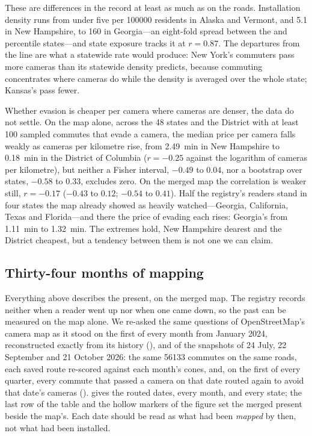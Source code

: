 \documentclass[11pt,twoside]{article}
\begin{document}
These are differences in the record at least as much as on the roads. Installation density
runs from under five per \num{100000} residents in Alaska and Vermont, and \num{5.1} in New
Hampshire, to \num{160} in Georgia---an eight-fold spread between the  and 
percentile states---and state exposure tracks it at $r=0.87$. The departures from the line are
what a statewide rate would produce: New York's commuters pass more cameras than its
statewide density predicts, because commuting concentrates where cameras do while the density
is averaged over the whole state; Kansas's pass fewer.

Whether evasion is cheaper per camera where cameras are denser, the data do not settle. On
the map alone, across the 48 states and the District with at least 100 sampled commutes that
evade a camera, the median price per
camera falls weakly as cameras per kilometre rise, from \SI{2.49}{\minute} in New Hampshire to
\SI{0.18}{\minute} in the District of Columbia ($r=-0.25$ against the logarithm of cameras per
kilometre), but neither a Fisher interval, $-0.49$ to $0.04$, nor a bootstrap over states,
$-0.58$ to $0.33$, excludes zero. On the merged map the correlation is weaker still, $r=-0.17$
($-0.43$ to $0.12$; $-0.54$ to $0.41$). Half the registry's
readers stand in four states the map already showed as heavily watched---Georgia, California,
Texas and Florida---and there the price of evading each rises: Georgia's from
\SI{1.11}{\minute} to \SI{1.32}{\minute}. The extremes hold, New Hampshire dearest and the
District cheapest, but a tendency between them is not one we can claim.

\subsection{Thirty-four months of mapping}
\label{sec:results:trend}

Everything above describes the present, on the merged map. The registry records neither
when a reader went up nor when one came down, so the past can be measured on the map alone. We
re-asked the same questions of OpenStreetMap's camera map as it stood on the first of every
month from January 2024, reconstructed exactly from its history (),
and of the snapshots of 24 July, 22 September and 21 October 2026: the same
\num{56133} commutes on the same roads, each saved route re-scored against each month's
cones, and, on the first of every quarter, every commute that passed a camera on that date
routed again to avoid that date's cameras ().  gives
the routed dates,  every month, and  every state; the
last row of the table and the hollow markers of the figure set the merged present beside the
map's. Each date should be read as what had been \emph{mapped} by then, not what had been
installed.
\end{document}
